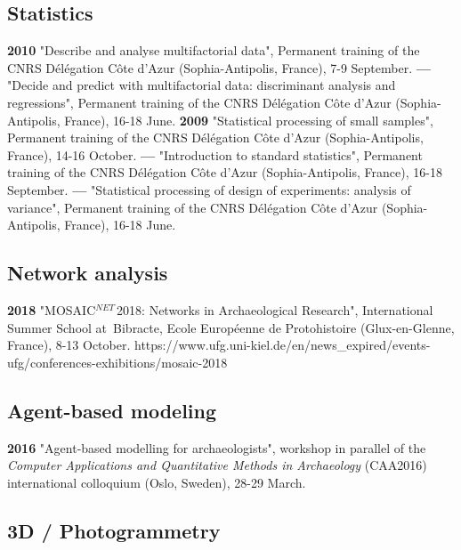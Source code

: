 \documentclass{article}
\begin{document}
\subsection*{Statistics }

\textbf{2010 }"Describe and analyse multifactorial data", Permanent training of the CNRS D\'{e}l\'{e}gation C\^{o}te d'Azur (Sophia-Antipolis, France), 7-9 September.
\smallbreak
\textbf{--- }"Decide and predict with multifactorial data: discriminant analysis and regressions", Permanent training of the CNRS D\'{e}l\'{e}gation C\^{o}te d'Azur (Sophia-Antipolis, France), 16-18 June.
\smallbreak
\textbf{2009 }"Statistical processing of small samples", Permanent training of the CNRS D\'{e}l\'{e}gation C\^{o}te d'Azur (Sophia-Antipolis, France), 14-16 October.
\smallbreak
\textbf{--- }"Introduction to standard statistics", Permanent training of the CNRS D\'{e}l\'{e}gation C\^{o}te d'Azur (Sophia-Antipolis, France), 16-18 September.
\smallbreak
\textbf{--- }"Statistical processing of design of experiments: analysis of variance", Permanent training of the CNRS D\'{e}l\'{e}gation C\^{o}te d'Azur (Sophia-Antipolis, France), 16-18 June.
\smallbreak

\subsection*{Network analysis}

\textbf{2018 }"MOSAIC${}^{NET\ }$2018: Networks in Archaeological Research", International Summer School at~Bibracte, Ecole Europ\'{e}enne de Protohistoire (Glux-en-Glenne, France), 8-13 October. https://www.ufg.uni-kiel.de/en/news_expired/events-ufg/conferences-exhibitions/mosaic-2018

\subsection*{Agent-based modeling}

\textbf{2016 }"Agent-based modelling for archaeologists", workshop in parallel of the \textit{Computer Applications and Quantitative Methods in Archaeology} (CAA2016) international colloquium (Oslo, Sweden), 28-29 March.

\subsection*{3D / Photogrammetry}
\end{document}

